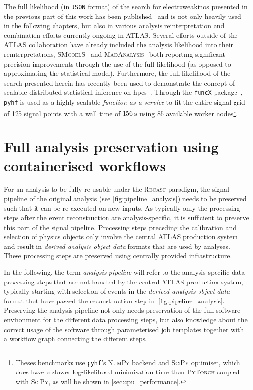 The full likelihood (in \texttt{JSON} format) of the search for electroweakinos presented in the previous part of this work has been published~\cite{fullLH_1Lbb} and is not only heavily used in the following chapters, but also in various analysis reinterpretation and combination efforts currently ongoing in ATLAS. Several efforts outside of the ATLAS collaboration have already included the analysis likelihood into their reinterpretations, \eg \textsc{SModelS}~\cite{SModelS_pyhf:2020grj} and \textsc{MadAnalysis}~\cite{Goodsell:2020ddr,Fuks:2021wpe} both reporting significant precision improvements through the use of the full likelihood (as opposed to approximating the statistical model). Furthermore, the full likelihood of the search presented herein has recently been used to demonstrate the concept of scalable distributed statistical inference on \glspl{hpc}~\cite{Feickert:2021sua}. Through the \texttt{funcX} package~\cite{chard20funcx}, \texttt{pyhf} is used as a highly scalable \textit{function as a service} to fit the entire signal grid of 125 signal points with a wall time of $\SI{156}{\second}$ using 85 available worker nodes\footnote{Theses benchmarks use \texttt{pyhf}'s \textsc{NumPy} backend and \textsc{SciPy} optimiser, which does have a slower log-likelihood minimisation time than \eg \textsc{PyTorch} coupled with \textsc{SciPy}, as will be shown in \cref{sec:cpu_performance}.}.

\section{Full analysis preservation using containerised workflows}\label{sec:recast_implementation}

For an analysis to be fully re-usable under the \textsc{Recast} paradigm, the signal pipeline of the original analysis (see \cref{fig:pipeline_analysis}) needs to be preserved such that it can be re-executed on new inputs. As typically only the processing steps after the event reconstruction are analysis-specific, it is sufficient to preserve this part of the signal pipeline. Processing steps preceding the calibration and selection of physics objects only involve the central ATLAS production system and result in \textit{derived analysis object data} formats that are used by analyses. These processing steps are preserved using centrally provided infrastructure.

   In the following, the term \textit{analysis pipeline} will refer to the analysis-specific data processing steps that are not handled by the central ATLAS production system, typically starting with selection of events in the \textit{derived analysis object data} format that have passed the reconstruction step in~\cref{fig:pipeline_analysis}. Preserving the analysis pipeline not only needs preservation of the full software environment for the different data processing steps, but also knowledge about the correct usage of the software through parameterised job templates together with a workflow graph connecting the different steps.

